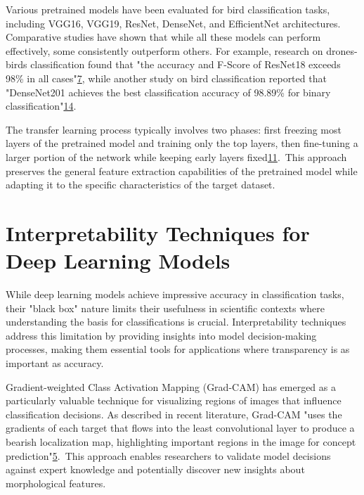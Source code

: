 Various pretrained models have been evaluated for bird classification tasks, including VGG16, VGG19, ResNet, DenseNet, and EfficientNet architectures. Comparative studies have shown that while all these models can perform effectively, some consistently outperform others. For example, research on drones-birds classification found that "the accuracy and F-Score of ResNet18 exceeds 98\% in all cases"\href{https://www.semanticscholar.org/paper/c16f57236555aae3f600ef8f1978eff10b410233}{7}, while another study on bird classification reported that "DenseNet201 achieves the best classification accuracy of 98.89\% for binary classification"\href{https://www.semanticscholar.org/paper/6529ad5f1094a8d9b0ab38db163c7fdaad2a1d9c}{14}.

The transfer learning process typically involves two phases: first freezing most layers of the pretrained model and training only the top layers, then fine-tuning a larger portion of the network while keeping early layers fixed\href{https://www.semanticscholar.org/paper/770ee68d1b136cd098a018a399d1f69af29faae0}{11}. This approach preserves the general feature extraction capabilities of the pretrained model while adapting it to the specific characteristics of the target dataset.

\section*{Interpretability Techniques for Deep Learning Models}
While deep learning models achieve impressive accuracy in classification tasks, their "black box" nature limits their usefulness in scientific contexts where understanding the basis for classifications is crucial. Interpretability techniques address this limitation by providing insights into model decision-making processes, making them essential tools for applications where transparency is as important as accuracy.

Gradient-weighted Class Activation Mapping (Grad-CAM) has emerged as a particularly valuable technique for visualizing regions of images that influence classification decisions. As described in recent literature, Grad-CAM "uses the gradients of each target that flows into the least convolutional layer to produce a bearish localization map, highlighting important regions in the image for concept prediction"\href{https://www.atlantis-press.com/article/125986223.pdf}{5}. This approach enables researchers to validate model decisions against expert knowledge and potentially discover new insights about morphological features.

